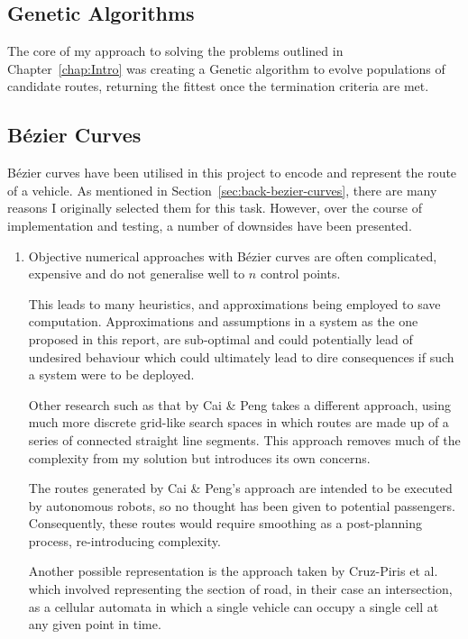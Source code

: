 \subsection{Genetic Algorithms}

The core of my approach to solving the problems outlined in Chapter~\ref{chap:Intro} was creating a Genetic algorithm to evolve populations of candidate routes, returning the fittest once the termination criteria are met.

\subsection{Bézier Curves}

Bézier curves have been utilised in this project to encode and represent the route of a vehicle. As mentioned in Section~\ref{sec:back-bezier-curves}, there are many reasons I originally selected them for this task. However, over the course of implementation and testing, a number of downsides have been presented.

\begin{enumerate}
  \item Objective numerical approaches with Bézier curves are often complicated, expensive and do not generalise well to $n$ control points.

        This leads to many heuristics, and approximations being employed to save computation. Approximations and assumptions in a system as the one proposed in this report, are sub-optimal and could potentially lead of undesired behaviour which could ultimately lead to dire consequences if such a system were to be deployed.

        Other research such as that by Cai \& Peng\cite{caiCooperativeCoevolutionaryAdaptive2002} takes a different approach, using much more discrete grid-like search spaces in which routes are made up of a series of connected straight line segments. This approach removes much of the complexity from my solution but introduces its own concerns.

        The routes generated by Cai \& Peng's approach are intended to be executed by autonomous robots, so no thought has been given to potential passengers. Consequently, these routes would require smoothing as a post-planning process, re-introducing complexity.

        Another possible representation is the approach taken by Cruz-Piris et al.\cite{cruz-pirisAutomatedOptimizationIntersections2019} which involved representing the section of road, in their case an intersection, as a cellular automata in which a single vehicle can occupy a single cell at any given point in time. 
\end{enumerate}


